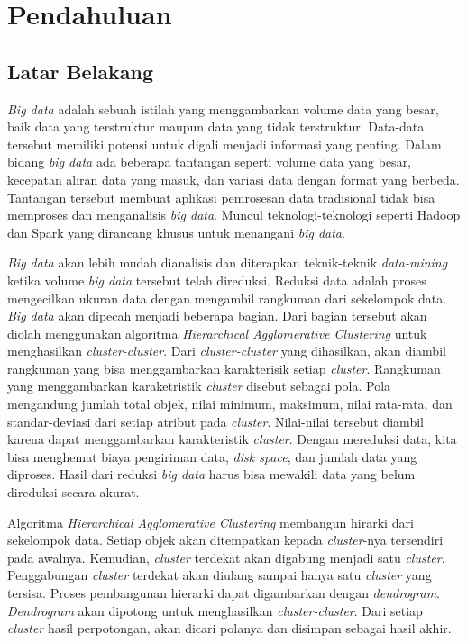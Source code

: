 \chapter{Pendahuluan}
\label{chap:intro}
   
\section{Latar Belakang}
\label{sec:label}

{\it Big data} adalah sebuah istilah yang menggambarkan volume data yang besar, baik data yang terstruktur maupun data yang tidak terstruktur. Data-data tersebut memiliki potensi untuk digali menjadi informasi yang penting. Dalam bidang {\it big data} ada  beberapa tantangan seperti volume data yang besar, kecepatan aliran data yang masuk, dan variasi data dengan format yang berbeda. Tantangan tersebut membuat aplikasi pemrosesan data tradisional  tidak bisa memproses dan menganalisis {\it big data}. Muncul teknologi-teknologi seperti Hadoop dan Spark yang dirancang khusus untuk menangani {\it big data}. 

{\it Big data} akan lebih mudah dianalisis dan diterapkan teknik-teknik {\it data-mining} ketika volume {\it big data} tersebut telah direduksi. Reduksi data adalah proses mengecilkan ukuran data dengan mengambil rangkuman dari sekelompok data. {\it Big data} akan dipecah menjadi beberapa bagian. Dari bagian tersebut akan diolah menggunakan algoritma {\it Hierarchical Agglomerative Clustering} untuk menghasilkan \textit{cluster-cluster}. Dari \textit{cluster-cluster} yang dihasilkan, akan diambil rangkuman yang bisa menggambarkan karakterisik setiap \textit{cluster}. Rangkuman yang menggambarkan karaketristik \textit{cluster} disebut sebagai pola. Pola mengandung jumlah total objek, nilai minimum, maksimum, nilai rata-rata, dan standar-deviasi dari setiap atribut pada \textit{cluster}. Nilai-nilai tersebut diambil karena dapat menggambarkan karakteristik \textit{cluster}. Dengan mereduksi data, kita bisa menghemat biaya pengiriman data, {\it disk space}, dan jumlah data yang diproses. Hasil dari reduksi {\it big data} harus bisa mewakili data yang belum direduksi secara akurat. 

Algoritma {\it Hierarchical Agglomerative Clustering} membangun hirarki dari sekelompok data. Setiap objek akan ditempatkan kepada \textit{cluster}-nya  tersendiri pada awalnya. Kemudian, \textit{cluster} terdekat akan digabung menjadi satu \textit{cluster}. Penggabungan \textit{cluster} terdekat akan diulang sampai hanya satu \textit{cluster} yang tersisa. Proses pembangunan hierarki dapat digambarkan dengan \textit{dendrogram}. \textit{Dendrogram} akan dipotong untuk menghasilkan \textit{cluster-cluster}. Dari setiap \textit{cluster} hasil perpotongan, akan dicari polanya dan disimpan sebagai hasil akhir. 

